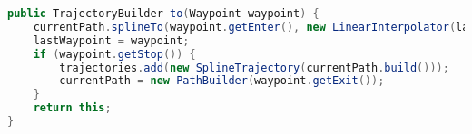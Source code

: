 \documentclass{article}
\begin{document}
\begin{lstlisting}[language=Java]
public TrajectoryBuilder to(Waypoint waypoint) {
	currentPath.splineTo(waypoint.getEnter(), new LinearInterpolator(lastWaypoint.getHeading(), waypoint.getHeading()));
	lastWaypoint = waypoint;
	if (waypoint.getStop()) {
		trajectories.add(new SplineTrajectory(currentPath.build()));
		currentPath = new PathBuilder(waypoint.getExit());
	}
	return this;
}
\end{lstlisting}
\end{document}
